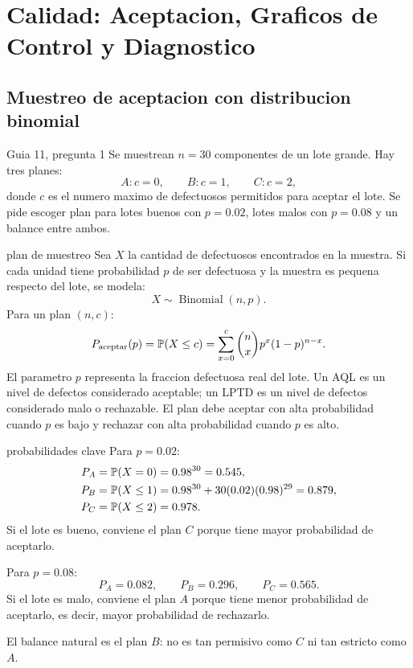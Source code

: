 \section{Calidad: Aceptacion, Graficos de Control y Diagnostico}

\subsection{Muestreo de aceptacion con distribucion binomial}

\begin{ejercicio}{Guia 11, pregunta 1}
Se muestrean $n=30$ componentes de un lote grande. Hay tres planes:
\[
  A: c=0, \qquad B: c=1, \qquad C: c=2,
\]
donde $c$ es el numero maximo de defectuosos permitidos para aceptar el lote. Se pide escoger plan para lotes buenos con $p=0.02$, lotes malos con $p=0.08$ y un balance entre ambos.
\end{ejercicio}

\begin{materia}{plan de muestreo}
Sea $X$ la cantidad de defectuosos encontrados en la muestra. Si cada unidad tiene probabilidad $p$ de ser defectuosa y la muestra es pequena respecto del lote, se modela:
\[
  X \sim \operatorname{Binomial}(n,p).
\]
Para un plan $(n,c)$:
\[
  P_{\text{aceptar}}(p)
  =
  \mathbb{P}(X \le c)
  =
  \sum_{x=0}^{c}\binom{n}{x}p^x(1-p)^{n-x}.
\]
El parametro $p$ representa la fraccion defectuosa real del lote. Un AQL es un nivel de defectos considerado aceptable; un LPTD es un nivel de defectos considerado malo o rechazable. El plan debe aceptar con alta probabilidad cuando $p$ es bajo y rechazar con alta probabilidad cuando $p$ es alto.
\end{materia}

\begin{solucion}{probabilidades clave}
Para $p=0.02$:
\[
\begin{aligned}
P_A &= \mathbb{P}(X=0)=0.98^{30}=0.545,\\
P_B &= \mathbb{P}(X\le 1)=0.98^{30}+30(0.02)(0.98)^{29}=0.879,\\
P_C &= \mathbb{P}(X\le 2)=0.978.
\end{aligned}
\]
Si el lote es bueno, conviene el plan $C$ porque tiene mayor probabilidad de aceptarlo.

Para $p=0.08$:
\[
  P_A=0.082, \qquad P_B=0.296, \qquad P_C=0.565.
\]
Si el lote es malo, conviene el plan $A$ porque tiene menor probabilidad de aceptarlo, es decir, mayor probabilidad de rechazarlo.

El balance natural es el plan $B$: no es tan permisivo como $C$ ni tan estricto como $A$.
\end{solucion}

